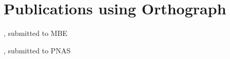 \chapter{Publications using Orthograph}
\label{app:papers-using-orthograph}

\citet{Gillung2018}, submitted to MBE

\citet{Johnson2018}, submitted to PNAS


%

%

%

%

